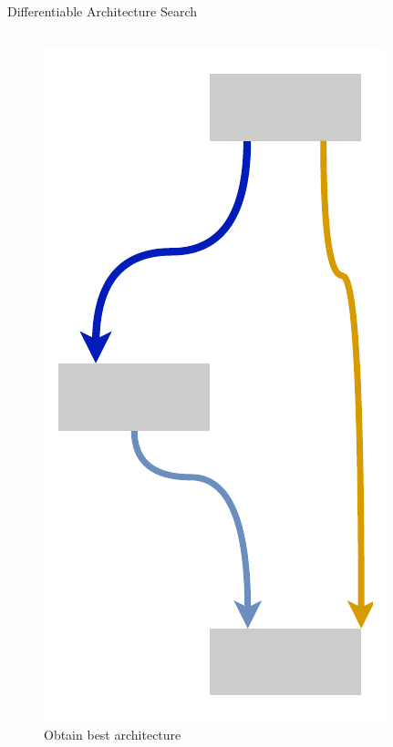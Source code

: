 \documentclass[]{beamer}
\begin{document}
\begin{frame}{Differentiable Architecture Search}
\begin{columns}
\begin{column}{.35\textwidth}
\begin{figure}
	\includegraphics[scale=0.4, center]{graphics/quick/darts_3.drawio.pdf}
	\caption{Obtain best architecture}
\end{figure}
\end{column}
\end{columns}
\end{frame}
\end{document}
